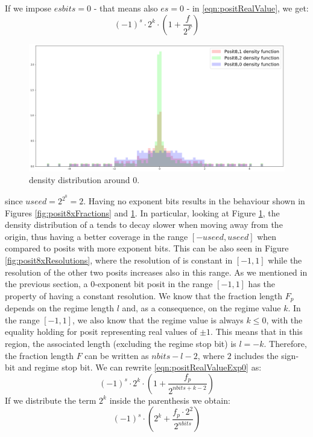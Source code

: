 If we impose $esbits = 0$ - that means also $es = 0$ - in \eqref{eqn:positRealValue}, we get:
\begin{equation}\label{eqn:positRealValueExp0}
    (-1)^s \cdot \text{2}^{k} \cdot \left ( 1+ \frac{f}{2^F} \right)
\end{equation}


\begin{figure}
    \centering
    \includegraphics[width=\linewidth]{img/posit8xDensities.png}
    \caption{ density distribution around $0$.}
    \label{fig:posit8xDistributions}
\end{figure}

since $useed = 2^{2^0} = 2$. Having no exponent bits results in the behaviour shown in Figures \ref{fig:posit8xFractions} and \ref{fig:posit8xDistributions}. In particular, looking at Figure \ref{fig:posit8xDistributions}, the density distribution of a  tends to decay slower when moving away from the origin, thus having a better coverage in the range $[-useed,useed]$ when compared to posits with more exponent bits. This can be also seen in Figure \ref{fig:posit8xResolutions}, where the resolution of  is constant in $[-1,1]$ while the resolution of the other two posits increases also in this range. 
As we mentioned in the previous section, a 0-exponent bit posit in the range $[-1,1]$ has the property of having a constant resolution. 
We know that the fraction length $F_p$ depends on the regime length $l$ and, as a consequence, on the regime value $k$. In the range $[-1,1]$, we also know that the regime value is always $k \leq 0$, with the equality holding for posit representing real values of $\pm 1$. This means that in this region, the associated length (excluding the regime stop bit) is $l = - k$. Therefore, the fraction length $F$ can be written as $nbits - l - 2$, where $2$ includes the sign-bit and regime stop bit. We can rewrite \eqref{eqn:positRealValueExp0} as:
\begin{equation*}
    (-1)^s \cdot 2^k \cdot \left ( 1 + \frac{f_p}{2^{nbits + k - 2}} \right )
\end{equation*}
If we distribute the term $2^k$ inside the parenthesis we obtain:
\begin{equation*}
    (-1)^s \cdot \left ( 2^k + \frac{f_p\cdot 2^2}{2^{nbits}} \right )
\end{equation*}


